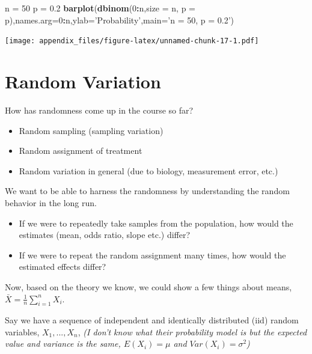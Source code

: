 \documentclass[
]{book}
\newenvironment{Shaded}{\begin{snugshade}}{\end{snugshade}}
\newcommand{\DataTypeTok}[1]{\textcolor[rgb]{0.13,0.29,0.53}{#1}}
\newcommand{\DecValTok}[1]{\textcolor[rgb]{0.00,0.00,0.81}{#1}}
\newcommand{\FloatTok}[1]{\textcolor[rgb]{0.00,0.00,0.81}{#1}}
\newcommand{\KeywordTok}[1]{\textcolor[rgb]{0.13,0.29,0.53}{\textbf{#1}}}
\newcommand{\NormalTok}[1]{#1}
\newcommand{\OperatorTok}[1]{\textcolor[rgb]{0.81,0.36,0.00}{\textbf{#1}}}
\newcommand{\StringTok}[1]{\textcolor[rgb]{0.31,0.60,0.02}{#1}}
\providecommand{\tightlist}{%
  \setlength{\itemsep}{0pt}\setlength{\parskip}{0pt}}
\begin{document}
\begin{Shaded}
\begin{Highlighting}[]
\NormalTok{n =}\StringTok{ }\DecValTok{50}
\NormalTok{p =}\StringTok{ }\FloatTok{0.2}
\KeywordTok{barplot}\NormalTok{(}\KeywordTok{dbinom}\NormalTok{(}\DecValTok{0}\OperatorTok{:}\NormalTok{n,}\DataTypeTok{size =}\NormalTok{ n, }\DataTypeTok{p =}\NormalTok{ p),}\DataTypeTok{names.arg=}\DecValTok{0}\OperatorTok{:}\NormalTok{n,}\DataTypeTok{ylab=}\StringTok{'Probability'}\NormalTok{,}\DataTypeTok{main=}\StringTok{'n = 50, p = 0.2'}\NormalTok{)}
\end{Highlighting}
\end{Shaded}

\texttt{[image: appendix\_files/figure-latex/unnamed-chunk-17-1.pdf]}

\hypertarget{random-variation}{%
\section{Random Variation}\label{random-variation}}

How has randomness come up in the course so far?

\begin{itemize}
\tightlist
\item
  Random sampling (sampling variation)
\item
  Random assignment of treatment
\item
  Random variation in general (due to biology, measurement error, etc.)
\end{itemize}

We want to be able to harness the randomness by understanding the random behavior in the long run.

\begin{itemize}
\tightlist
\item
  If we were to repeatedly take samples from the population, how would the estimates (mean, odds ratio, slope etc.) differ?
\item
  If we were to repeat the random assignment many times, how would the estimated effects differ?
\end{itemize}

Now, based on the theory we know, we could show a few things about means, \(\bar{X} = \frac{1}{n}\sum_{i=1}^n X_i\).

Say we have a sequence of independent and identically distributed (iid) random variables, \(X_1,...,X_n\), \emph{(I don't know what their probability model is but the expected value and variance is the same, \(E(X_i) = \mu\) and \(Var(X_i) = \sigma^2\))}
\end{document}
